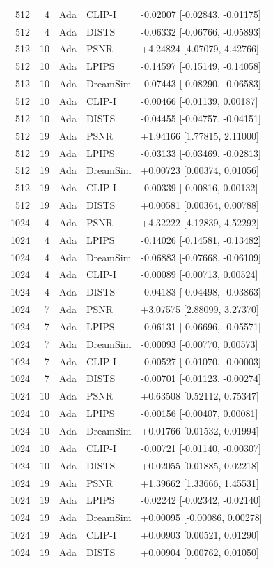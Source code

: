 \documentclass[10pt,letterpaper]{article}
\begin{document}
\begin{longtable}{@{}rrlll@{}}
512 & 4 & Ada & CLIP-I & -0.02007 [-0.02843, -0.01175]\\
512 & 4 & Ada & DISTS & -0.06332 [-0.06766, -0.05893]\\
512 & 10 & Ada & PSNR & +4.24824 [4.07079, 4.42766]\\
512 & 10 & Ada & LPIPS & -0.14597 [-0.15149, -0.14058]\\
512 & 10 & Ada & DreamSim & -0.07443 [-0.08290, -0.06583]\\
512 & 10 & Ada & CLIP-I & -0.00466 [-0.01139, 0.00187]\\
512 & 10 & Ada & DISTS & -0.04455 [-0.04757, -0.04151]\\
512 & 19 & Ada & PSNR & +1.94166 [1.77815, 2.11000]\\
512 & 19 & Ada & LPIPS & -0.03133 [-0.03469, -0.02813]\\
512 & 19 & Ada & DreamSim & +0.00723 [0.00374, 0.01056]\\
512 & 19 & Ada & CLIP-I & -0.00339 [-0.00816, 0.00132]\\
512 & 19 & Ada & DISTS & +0.00581 [0.00364, 0.00788]\\
1024 & 4 & Ada & PSNR & +4.32222 [4.12839, 4.52292]\\
1024 & 4 & Ada & LPIPS & -0.14026 [-0.14581, -0.13482]\\
1024 & 4 & Ada & DreamSim & -0.06883 [-0.07668, -0.06109]\\
1024 & 4 & Ada & CLIP-I & -0.00089 [-0.00713, 0.00524]\\
1024 & 4 & Ada & DISTS & -0.04183 [-0.04498, -0.03863]\\
1024 & 7 & Ada & PSNR & +3.07575 [2.88099, 3.27370]\\
1024 & 7 & Ada & LPIPS & -0.06131 [-0.06696, -0.05571]\\
1024 & 7 & Ada & DreamSim & -0.00093 [-0.00770, 0.00573]\\
1024 & 7 & Ada & CLIP-I & -0.00527 [-0.01070, -0.00003]\\
1024 & 7 & Ada & DISTS & -0.00701 [-0.01123, -0.00274]\\
1024 & 10 & Ada & PSNR & +0.63508 [0.52112, 0.75347]\\
1024 & 10 & Ada & LPIPS & -0.00156 [-0.00407, 0.00081]\\
1024 & 10 & Ada & DreamSim & +0.01766 [0.01532, 0.01994]\\
1024 & 10 & Ada & CLIP-I & -0.00721 [-0.01140, -0.00307]\\
1024 & 10 & Ada & DISTS & +0.02055 [0.01885, 0.02218]\\
1024 & 19 & Ada & PSNR & +1.39662 [1.33666, 1.45531]\\
1024 & 19 & Ada & LPIPS & -0.02242 [-0.02342, -0.02140]\\
1024 & 19 & Ada & DreamSim & +0.00095 [-0.00086, 0.00278]\\
1024 & 19 & Ada & CLIP-I & +0.00903 [0.00521, 0.01290]\\
1024 & 19 & Ada & DISTS & +0.00904 [0.00762, 0.01050]\\
\bottomrule\end{longtable}
\end{document}
